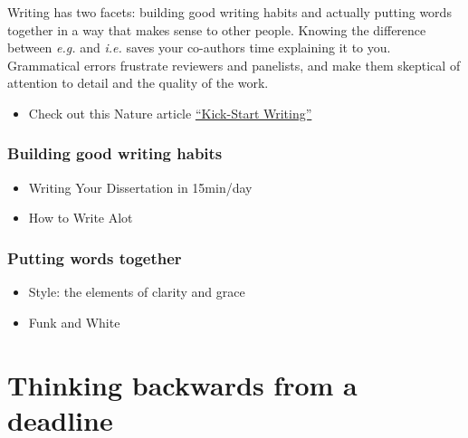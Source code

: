 \documentclass[
  letterpaper,
  DIV=11,
  numbers=noendperiod]{scrreprt}
\providecommand{\tightlist}{%
  \setlength{\itemsep}{0pt}\setlength{\parskip}{0pt}}\usepackage{longtable,booktabs,array}
\begin{document}
Writing has two facets: building good writing habits and actually
putting words together in a way that makes sense to other people.
Knowing the difference between \emph{e.g.} and \emph{i.e.} saves your
co-authors time explaining it to you. Grammatical errors frustrate
reviewers and panelists, and make them skeptical of attention to detail
and the quality of the work.

\begin{itemize}
\tightlist
\item
  Check out this Nature article
  \href{https://www.nature.com/articles/d41586-020-00917-5}{``Kick-Start
  Writing''}
\end{itemize}

\hypertarget{building-good-writing-habits}{%
\subsubsection*{\texorpdfstring{\textbf{Building good writing
habits}}{Building good writing habits}}\label{building-good-writing-habits}}

\begin{itemize}
\item
  Writing Your Dissertation in 15min/day
\item
  How to Write Alot
\end{itemize}

\hypertarget{putting-words-together}{%
\subsubsection*{\texorpdfstring{\textbf{Putting words
together}}{Putting words together}}\label{putting-words-together}}

\begin{itemize}
\item
  Style: the elements of clarity and grace
\item
  Funk and White
\end{itemize}

\hypertarget{thinking-backwards-from-a-deadline}{%
\section*{\texorpdfstring{\textbf{Thinking backwards from a
deadline}}{Thinking backwards from a deadline}}\label{thinking-backwards-from-a-deadline}}
\end{document}
